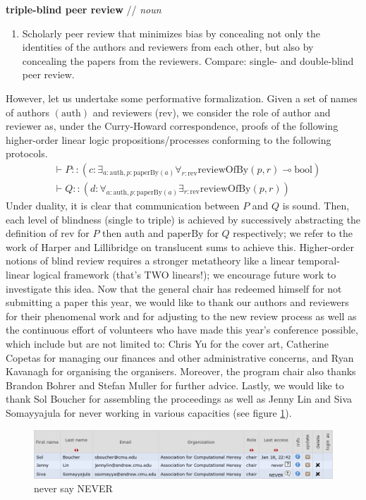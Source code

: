 \documentclass[12pt]{article}
\newcommand{\auth}{\text{auth}}
\newcommand{\paperby}{\text{paperBy}}
\newcommand{\reviewofby}{\text{reviewOfBy}}
\newcommand{\bool}{\text{bool}}
\newcommand{\rev}{\text{rev}}
\begin{document}
\textbf{triple-blind peer review} // \emph{noun}
\begin{enumerate}
\item Scholarly peer review that minimizes bias by concealing not only the identities of the authors and reviewers from each other, but also by concealing the papers from the reviewers. Compare: single- and double-blind peer review.
\end{enumerate}
However, let us undertake some performative formalization. Given a set of names of authors $(\auth)$ and reviewers ($\rev$), we consider the role of author and reviewer as, under the Curry-Howard correspondence, proofs of the following higher-order linear logic propositions/processes conforming to the following protocols.
\begin{align*}
&\vdash P::(c:\exists_{a:\auth,p:\paperby(a)}\forall_{r:\rev}\reviewofby(p, r)\multimap\bool)\\
&\vdash Q::(d:\forall_{a:\auth,p:\paperby(a)}\exists_{r:\rev}\reviewofby(p, r))
\end{align*}
Under duality, it is clear that communication between $P$ and $Q$ is sound. Then, each level of blindness (single to triple) is achieved by successively abstracting the definition of $\rev$ for $P$ then $\auth$ and $\paperby$ for $Q$ respectively; we refer to the work of Harper and Lillibridge \cite{harper+:sharing} on translucent sums to achieve this. Higher-order notions of blind review requires a stronger metatheory like a linear temporal-linear logical framework (that’s TWO linears!); we encourage future work to investigate this idea.
Now that the general chair has redeemed himself for not submitting a paper this year, we would like to thank our authors and reviewers for their phenomenal work and for adjusting to the new review process as well as the continuous effort of volunteers who have made this year’s conference possible, which include but are not limited to: Chris Yu for the cover art, Catherine Copetas for managing our finances and other administrative concerns, and Ryan Kavanagh for organising the organisers. Moreover, the program chair also thanks Brandon Bohrer and Stefan Muller for further advice. Lastly, we would like to thank Sol Boucher for assembling the proceedings as well as Jenny Lin and Siva Somayyajula for never working in various capacities (see figure \ref{fig:never}).
\begin{figure}
\centering
\includegraphics[width=\textwidth]{never.png}
\caption{never say NEVER}
\label{fig:never}
\end{figure}
\end{document}
